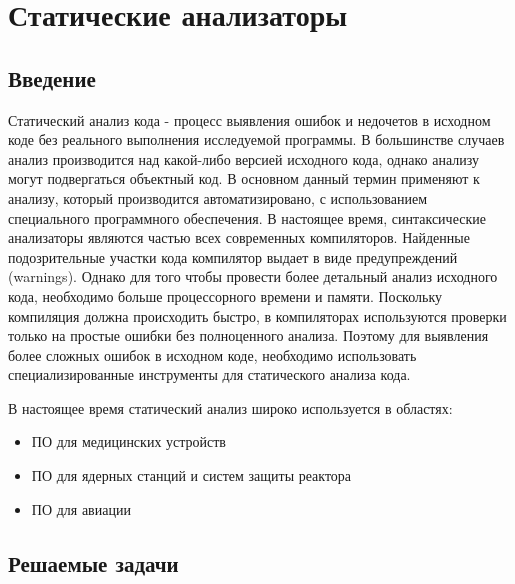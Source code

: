 \chapter{Статические анализаторы}

\section{Введение}

Статический анализ кода - процесс выявления ошибок и недочетов в исходном коде без реального выполнения 
исследуемой программы. В большинстве случаев анализ производится над какой-либо версией исходного кода,
однако анализу могут подвергаться объектный код. В основном данный термин применяют к анализу,
который производится автоматизировано, с использованием специального программного обеспечения.
В настоящее время, синтаксические анализаторы являются частью всех современных компиляторов. 
Найденные подозрительные участки кода компилятор выдает в виде предупреждений (warnings). 
Однако для того чтобы провести более детальный анализ исходного кода, необходимо больше процессорного времени и памяти. 
Поскольку компиляция должна происходить быстро, в компиляторах используются проверки только
на простые ошибки без полноценного анализа. Поэтому для выявления более сложных ошибок в исходном коде, 
необходимо использовать специализированные инструменты для статического анализа кода.

В настоящее время статический анализ широко используется в областях:
\begin{itemize}
	\item ПО для медицинских устройств
	\item ПО для ядерных станций и систем защиты реактора
	\item ПО для авиации
\end{itemize}

\section{Решаемые задачи}

